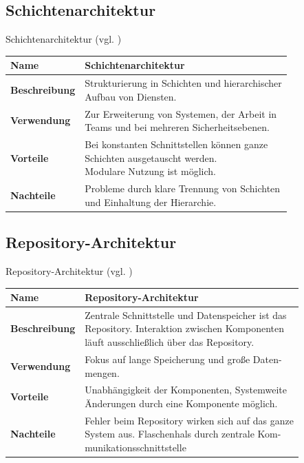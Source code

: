 \documentclass{beamer}
\begin{document}
			\subsection{Schichtenarchitektur}
			\begin{frame}{Schichtenarchitektur (vgl. \cite[ S. 194]{sommer})}
			\begin{tabular}{*{2}{l}}
				\toprule
				\textbf{Name}&\textbf{Schichtenarchitektur}\\
				\midrule
				\midrule
				\textbf{Beschreibung}&\makecell[l]{Strukturierung in Schichten und hierarchischer\\ Aufbau von Diensten.}\\
				\midrule
				\textbf{Verwendung}&\makecell[l]{Zur Erweiterung von Systemen, der Arbeit in\\ Teams und bei mehreren Sicherheitsebenen.}\\
				\midrule
				\textbf{Vorteile}&\makecell[l]{Bei konstanten Schnittstellen können ganze\\ Schichten ausgetauscht werden.\\ Modulare Nutzung ist möglich.}\\
				\midrule
				\textbf{Nachteile}&\makecell[l]{Probleme durch klare Trennung von Schichten\\ und Einhaltung der Hierarchie.}\\
				\bottomrule
			\end{tabular}
			\end{frame}
			\subsection{Repository-Architektur}
			\begin{frame}{Repository-Architektur (vgl. \cite[ S. 196f]{sommer})}
			\begin{tabular}{*{2}{l}}
				\toprule
				\textbf{Name}&\textbf{Repository-Architektur}\\
				\midrule
				\midrule
				\textbf{Beschreibung}&\makecell[l]{Zentrale Schnittstelle und Datenspeicher ist das\\ Repository. Interaktion zwischen Komponenten\\ läuft ausschließlich über das Repository.}\\
				\midrule
				\textbf{Verwendung}&\makecell[l]{Fokus auf lange Speicherung und große Daten-\\mengen.}\\
				\midrule
				\textbf{Vorteile}&\makecell[l]{Unabhängigkeit der Komponenten, Systemweite\\ Änderungen durch eine Komponente möglich.}\\
				\midrule
				\textbf{Nachteile}&\makecell[l]{Fehler beim Repository wirken sich auf das ganze\\ System aus. Flaschenhals durch zentrale Kom-\\munikationsschnittstelle}\\
				\bottomrule
			\end{tabular}
			\end{frame}	
\end{document}
